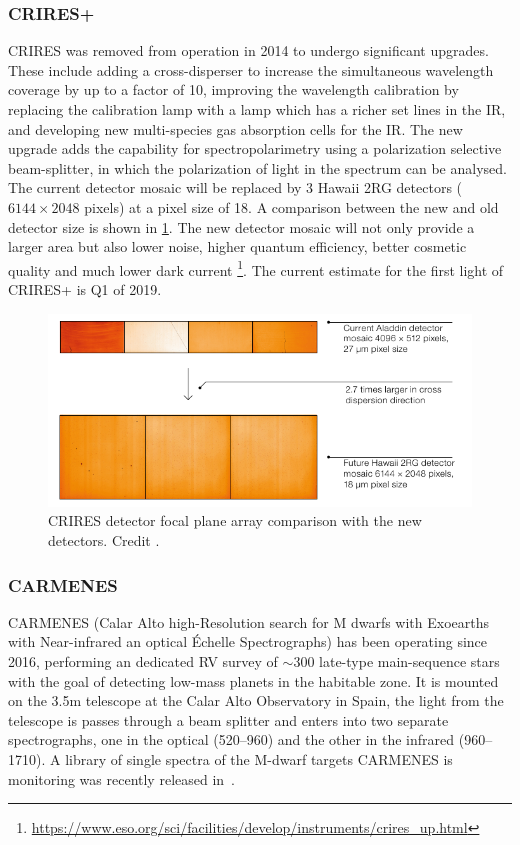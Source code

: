 \subsubsection{CRIRES+}
\label{subsubsec:criresplus}
CRIRES was removed from operation in 2014 to undergo significant upgrades\citep{dorn_crires_2014}.
These include adding a cross-disperser to increase the simultaneous wavelength coverage by up to a factor of 10, improving the wavelength calibration by replacing the \thar{} calibration lamp with a \une{} lamp which has a richer set lines in the IR, and developing new multi-species gas absorption cells for the IR.
The new upgrade adds the capability for spectropolarimetry using a polarization selective beam-splitter, in which the polarization of light in the spectrum can be analysed.
The current detector mosaic will be replaced by 3 Hawaii 2RG detectors (\(6144\times 2048\) pixels) at a pixel size of 18\um{}.
A comparison between the new and old detector size is shown in \cref{fig:criresplus_detecotrs}. 
The new detector mosaic will not only provide a larger area but also lower noise, higher quantum efficiency, better cosmetic quality and much lower dark current
\footnote{\href{https://www.eso.org/sci/facilities/develop/instruments/crires_up.html}{https://www.eso.org/sci/facilities/develop/instruments/crires\_up.html}}.
The current estimate for the first light of CRIRES+ is Q1 of 2019.

\begin{figure}
    \centering
    \includegraphics[width=0.5\linewidth]{figures/spectroscopy/criresplus_detectors.pdf}
    \caption{CRIRES detector focal plane array comparison with the new detectors.
    Credit \citep{dorn_crires_2014}.}
    \label{fig:criresplus_detecotrs}
\end{figure}

\subsubsection{CARMENES}
\label{subsubsec:carmenes}
{CARMENES} (Calar Alto high-Resolution search for M dwarfs with Exoearths with Near-infrared an optical \'Echelle Spectrographs) has been operating since 2016, performing an dedicated RV survey of \(\sim300\) late-type main-sequence stars with the goal of detecting low-mass planets in the habitable zone. It is mounted on the 3.5\si{\metre} telescope at the Calar Alto Observatory in Spain, the light from the telescope is passes through a beam splitter and enters into two separate spectrographs, one in the optical (520--960\nm) and the other in the infrared (960--1710\nm). A library of single spectra of the {M-dwarf} targets CARMENES is monitoring was recently released in~\citep{reiners_carmenes_2018}.

